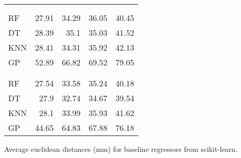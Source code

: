 \begin{margintable}
\begin{tabularx}{1\marginparwidth}{Xd{2.1}d{2.1}d{1.1}d{1.1}}
		&&    
		 &
		 &
		 \\
		\\
		\midrule
		RF & 27.91 & 34.29  & 36.05  & 40.45 \\ 
		DT & 28.39 & 35.1   & 35.03  & 41.52 \\ 
		KNN& 28.41 & 34.31  & 35.92  & 42.13 \\ 
		GP & 52.89 & 66.82  & 69.52  & 79.05 \\ 
		\midrule
		&&    
		 &
		 &
		\\
		\\
		\midrule
		RF &27.54 & 33.58  & 35.24  & 40.18 \\ 
		DT &27.9  & 32.74  & 34.67  & 39.54 \\ 
		KNN&28.1  & 33.99  & 35.93  & 41.62 \\ 
		GP &44.65 & 64.83  & 67.88  & 76.18 \\ 
		\bottomrule
	\end{tabularx}%
	\caption[Baseline data]{\small Average euclidean distances (mm) for baseline regressors from scikit-learn\protect\footnotemark.}
	\label{tab:baseline}
\end{margintable}





